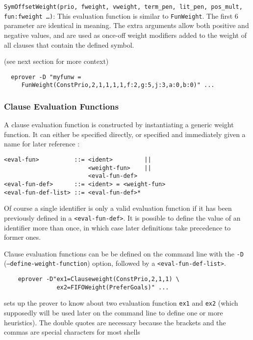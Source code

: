 \documentclass{report}
\begin{document}
\medskip
\begin{sloppypar}
  \noindent{}\texttt{SymOffsetWeight(prio, fweight, vweight,
    term\_pen, lit\_pen, pos\_mult, fun:fweight \ldots)}:
  This evaluation function is similar to \texttt{FunWeight}. The first
  6 parameter are identical in meaning.  The extra arguments allow
  both positive and negative values, and are used as once-off weight
  modifiers added to the weight of all clauses that contain the
  defined symbol.

  \begin{example}
    (see next section for more context)
\begin{verbatim}
  eprover -D "myfunw =
     FunWeight(ConstPrio,2,1,1,1,1,f:2,g:5,j:3,a:0,b:0)" ...
\end{verbatim}
  \end{example}

\end{sloppypar}


\subsubsection{Clause Evaluation Functions}

A clause evaluation function is constructed by instantiating a generic
weight function. It can either be specified directly, or specified and
immediately given a name for later reference :

 \begin{verbatim}
<eval-fun>          ::= <ident>         ||
                        <weight-fun>    ||
                        <eval-fun-def>
<eval-fun-def>      ::= <ident> = <weight-fun>
<eval-fun-def-list> ::= <eval-fun-def>*
\end{verbatim}

Of course a single identifier is only a valid evaluation function if
it has been previously defined in a \texttt{<eval-fun-def>}. It is
possible to define the value of an identifier more than once, in which
case later definitions take precedence to former ones.

Clause evaluation functions can be be defined on the command line with
the \texttt{-D} (\texttt{--define-weight-function}) option, followed
by a \texttt{<eval-fun-def-list>}.

\begin{example}
\begin{verbatim}
    eprover -D"ex1=Clauseweight(ConstPrio,2,1,1) \
               ex2=FIFOWeight(PreferGoals)" ...
\end{verbatim}
  sets up the prover to know about two evaluation function
  \texttt{ex1} and \texttt{ex2} (which supposedly will be used later on
  the command line to define one or more heuristics). The double
  quotes are necessary because the brackets and the commas are
  special characters for most shells
\end{example}
\end{document}
